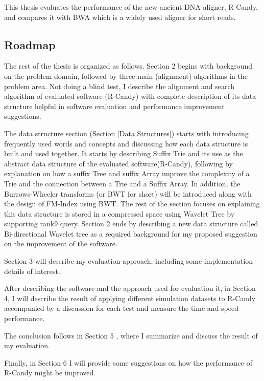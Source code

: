 \documentclass[11pt,a4paper]{report}
\begin{document}
This thesis evaluates the performance of the new ancient DNA aligner,
R-Candy, and compares it with BWA which is a widely used aligner for
short reads.




\subsection{Roadmap} \label{Roadmap}


The rest of the thesis is organized as follows.
Section 2 begins with background on the problem domain, followed by three main 
(alignment) algorithms in the problem area. Not doing a blind test, I describe 
the alignment and search algorithm of evaluated software (R-Candy) with complete 
description of its data structure helpful in software evaluation and performance 
improvement suggestions.

The data structure section (Section \ref{Data Structures}) starts with introducing 
frequently used words and concepts and discussing how each data structure is 
built and used together. It starts by describing Suffix Trie and its use as the
abstract data structure of the evaluated software(R-Candy), following by 
explanation on  how a suffix Tree and suffix Array improve the complexity of a 
Trie and the connection between a Trie and a Suffix Array. In addition, the
Burrows-Wheeler transforms (or BWT for short) will be introduced along with the
design of FM-Index using BWT. The rest of the section focuses on explaining this 
data structure  is stored in a compressed space using Wavelet Tree by supporting
rank9 query. Section 2 ends by describing a new data structure called 
Bi-directional Wavelet tree as a required background for my proposed 
suggestion on the improvement of the software.

Section 3 will describe my evaluation approach, including some implementation 
details of interest.

After describing the software and the approach used for evaluation it, in 
Section 4, I will describe the result of applying different simulation datasets
to R-Candy accompanied by a discussion for each test and measure the time and 
speed performance.

The conclusion follows in Section 5 , where I summarize and discuss the result 
of my evaluation.

Finally, in Section 6 I will provide some suggestions on how the performance of
R-Candy might be improved. 
\end{document}
